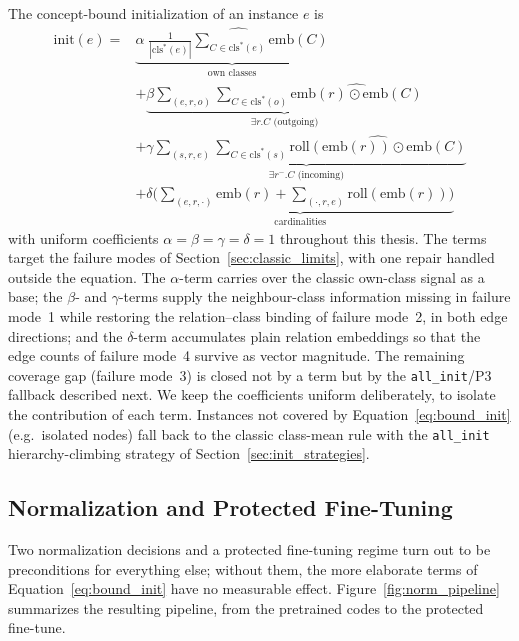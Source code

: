 \documentclass[a4paper,oneside,bibliography=totoc]{scrbook}
\begin{document}
The concept-bound initialization of an instance $e$ is
\begin{equation}
\label{eq:bound_init}
\begin{aligned}
\mathrm{init}(e)
={}& \underbrace{\alpha \;\widehat{\textstyle\frac{1}{|\mathrm{cls}^*(e)|}\sum_{C \in \mathrm{cls}^*(e)} \mathrm{emb}(C)}}_{\text{own classes}} \\
&+ \underbrace{\beta \sum_{(e,r,o)} \sum_{C \in \mathrm{cls}^*(o)} \widehat{\mathrm{emb}(r) \odot \mathrm{emb}(C)}}_{\exists r.C \text{ (outgoing)}} \\
&+ \underbrace{\gamma \sum_{(s,r,e)} \sum_{C \in \mathrm{cls}^*(s)} \widehat{\mathrm{roll}(\mathrm{emb}(r)) \odot \mathrm{emb}(C)}}_{\exists r^{-}.C \text{ (incoming)}} \\
&+ \underbrace{\delta \Big( \sum_{(e,r,\cdot)} \mathrm{emb}(r) + \sum_{(\cdot,r,e)} \mathrm{roll}(\mathrm{emb}(r)) \Big)}_{\text{cardinalities}}
\end{aligned}
\end{equation}
with uniform coefficients $\alpha = \beta = \gamma = \delta = 1$ throughout
this thesis. The terms target the failure modes of
Section~\ref{sec:classic_limits}, with one repair handled outside the equation.
The $\alpha$-term carries over the classic own-class signal as a base; the
$\beta$- and $\gamma$-terms supply the neighbour-class information missing in
failure mode~1 while restoring the relation--class binding of failure mode~2, in
both edge directions; and the $\delta$-term accumulates plain relation embeddings
so that the edge counts of failure mode~4 survive as vector magnitude. The
remaining coverage gap (failure mode~3) is closed not by a term but by the
\texttt{all\_init}/P3 fallback described next. We keep the
coefficients uniform deliberately, to isolate the contribution of each term.
Instances not
covered by Equation~\eqref{eq:bound_init} (e.g.\ isolated nodes) fall back to
the classic class-mean rule with the \texttt{all\_init} hierarchy-climbing
strategy of Section~\ref{sec:init_strategies}.

\subsection{Normalization and Protected Fine-Tuning}
\label{sec:norm}

Two normalization decisions and a protected fine-tuning regime turn out to be
preconditions for everything else; without them, the more elaborate terms of
Equation~\eqref{eq:bound_init} have no measurable effect.
Figure~\ref{fig:norm_pipeline} summarizes the resulting pipeline, from the
pretrained codes to the protected fine-tune.
\end{document}
